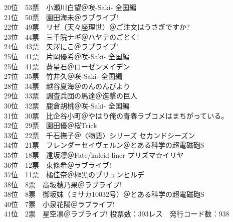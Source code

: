 {    20位　53票　小瀬川白望＠咲-Saki- 全国編                                   \\
    21位　50票　園田海未＠ラブライブ!                                         \\
    22位　49票　リゼ（天々座理世）＠ご注文はうさぎですか?                     \\
    23位　44票　三千院ナギ＠ハヤテのごとく!                                   \\
    24位　43票　矢澤にこ＠ラブライブ!                                         \\
    25位　41票　片岡優希＠咲-Saki- 全国編                                     \\
    25位　41票　蒼星石＠ローゼンメイデン                                      \\
    27位　35票　竹井久＠咲-Saki- 全国編                                       \\
    28位　34票　越谷夏海＠のんのんびより                                      \\
    29位　33票　調査兵団の馬達＠進撃の巨人                                    \\
    30位　32票　鹿倉胡桃＠咲-Saki- 全国編                                     \\
    31位　30票　比企谷小町＠やはり俺の青春ラブコメはまちがっている。          \\
    32位　29票　園田優＠桜Trick                                               \\
    33位　22票　千石撫子＠〈物語〉シリーズ セカンドシーズン                   \\
    34位　21票　フレンダ＝セイヴェルン＠とある科学の超電磁砲S                 \\
    35位　18票　遠坂凛＠Fate/kaleid liner プリズマ☆イリヤ                    \\
    36位　12票　東條希＠ラブライブ!                                           \\
    37位　11票　橘佳奈＠極黒のブリュンヒルデ                                  \\
    38位　8票　高坂穂乃果＠ラブライブ!                                        \\
    38位　8票　御坂妹（ミサカ10032号）＠とある科学の超電磁砲S                 \\
    40位　7票　小泉花陽＠ラブライブ!                                          \\
    41位　2票　星空凛＠ラブライブ!
}{
    投票数：393レス　発行コード数：938                                        \\
}
